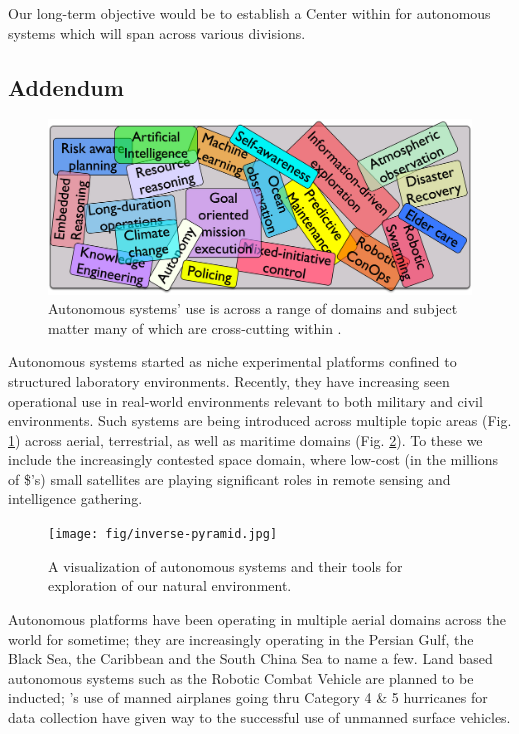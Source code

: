 \documentclass[11pt,letterpaper]{article}
\begin{document}
Our long-term objective would be to establish a Center within \org for
autonomous systems which will span across various divisions.

\pagebreak

\subsection{Addendum}

\begin{figure}
  \vspace{-0.5cm}
  \centering
  \includegraphics[scale=0.06]{fig/word-bag.jpg}
  \caption{Autonomous systems' use is across a range of domains and
    subject matter many of which are cross-cutting within \orge.}
 \label{fig:topics}
\end{figure}

Autonomous systems started as niche experimental platforms confined to
structured laboratory environments. Recently, they have increasing
seen operational use in real-world environments relevant to both
military and civil environments. Such systems are being introduced
across multiple topic areas (Fig. \ref{fig:topics}) across aerial,
terrestrial, as well as maritime domains (Fig. \ref{fig:inverse}). To
these we include the increasingly contested space domain, where
low-cost (in the millions of \$'s) small satellites are playing
significant roles in remote sensing and intelligence gathering.

\begin{figure}  
  \centering 
  \texttt{[image: fig/inverse-pyramid.jpg]} 
  \caption{A visualization of autonomous systems and their tools for
    exploration of our natural environment.}
  \label{fig:inverse}
\end{figure}

Autonomous platforms have been operating in multiple aerial domains
across the world for sometime; they are increasingly operating in the
Persian Gulf, the Black Sea, the Caribbean and the South China Sea to
name a few. Land based autonomous systems such as the Robotic Combat
Vehicle are planned to be inducted; \noae's use of manned airplanes
going thru Category 4 \& 5 hurricanes for data collection have given
way to the successful use of unmanned surface vehicles.
\end{document}
